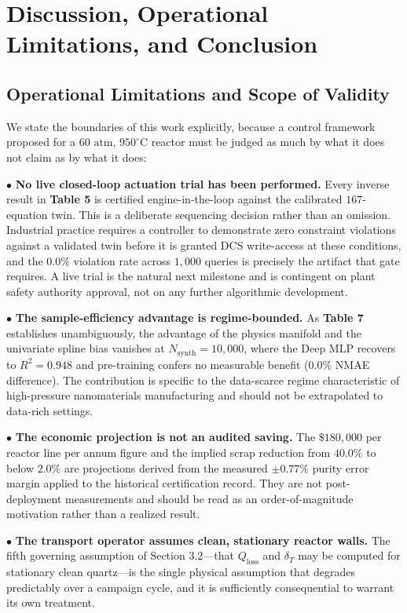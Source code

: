 \documentclass[10pt,journal,onecolumn]{IEEEtran}
\begin{document}
\section{Discussion, Operational Limitations, and Conclusion}
\subsection{Operational Limitations and Scope of Validity}
We state the boundaries of this work explicitly, because a control framework proposed for a $60\text{ atm}$, $950^\circ\text{C}$ reactor must be judged as much by what it does not claim as by what it does:

\noindent $\bullet$ \textbf{No live closed-loop actuation trial has been performed.} Every inverse result in \textbf{Table 5} is certified engine-in-the-loop against the calibrated $167$-equation twin. This is a deliberate sequencing decision rather than an omission. Industrial practice requires a controller to demonstrate zero constraint violations against a validated twin before it is granted DCS write-access at these conditions, and the $0.0\%$ violation rate across $1,000$ queries is precisely the artifact that gate requires. A live trial is the natural next milestone and is contingent on plant safety authority approval, not on any further algorithmic development.\par\smallskip
\noindent $\bullet$ \textbf{The sample-efficiency advantage is regime-bounded.} As \textbf{Table 7} establishes unambiguously, the advantage of the physics manifold and the univariate spline bias vanishes at $N_{\text{synth}} = 10,000$, where the Deep MLP recovers to $R^2 = 0.948$ and pre-training confers no measurable benefit ($0.0\%$ NMAE difference). The contribution is specific to the data-scarce regime characteristic of high-pressure nanomaterials manufacturing and should not be extrapolated to data-rich settings.\par\smallskip
\noindent $\bullet$ \textbf{The economic projection is not an audited saving.} The $\$180,000$ per reactor line per annum figure and the implied scrap reduction from $40.0\%$ to below $2.0\%$ are projections derived from the measured $\pm 0.77\%$ purity error margin applied to the historical certification record. They are not post-deployment measurements and should be read as an order-of-magnitude motivation rather than a realized result.\par\smallskip
\noindent $\bullet$ \textbf{The transport operator assumes clean, stationary reactor walls.} The fifth governing assumption of Section 3.2—that $Q_{\text{loss}}$ and $\delta_T$ may be computed for stationary clean quartz—is the single physical assumption that degrades predictably over a campaign cycle, and it is sufficiently consequential to warrant its own treatment.\par\smallskip
\end{document}
